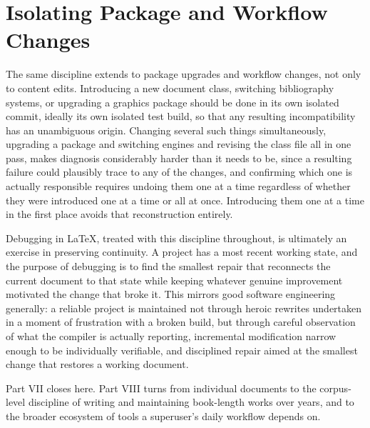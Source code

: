 \hypertarget{isolating-package-and-workflow-changes}{%
\section{Isolating Package and Workflow Changes}\label{isolating-package-and-workflow-changes}}

The same discipline extends to package upgrades and workflow changes, not only to content edits. Introducing a new document class, switching bibliography systems, or upgrading a graphics package should be done in its own isolated commit, ideally its own isolated test build, so that any resulting incompatibility has an unambiguous origin. Changing several such things simultaneously, upgrading a package and switching engines and revising the class file all in one pass, makes diagnosis considerably harder than it needs to be, since a resulting failure could plausibly trace to any of the changes, and confirming which one is actually responsible requires undoing them one at a time regardless of whether they were introduced one at a time or all at once. Introducing them one at a time in the first place avoids that reconstruction entirely.

Debugging in LaTeX, treated with this discipline throughout, is ultimately an exercise in preserving continuity. A project has a most recent working state, and the purpose of debugging is to find the smallest repair that reconnects the current document to that state while keeping whatever genuine improvement motivated the change that broke it. This mirrors good software engineering generally: a reliable project is maintained not through heroic rewrites undertaken in a moment of frustration with a broken build, but through careful observation of what the compiler is actually reporting, incremental modification narrow enough to be individually verifiable, and disciplined repair aimed at the smallest change that restores a working document.

Part VII closes here. Part VIII turns from individual documents to the corpus-level discipline of writing and maintaining book-length works over years, and to the broader ecosystem of tools a superuser's daily workflow depends on.
